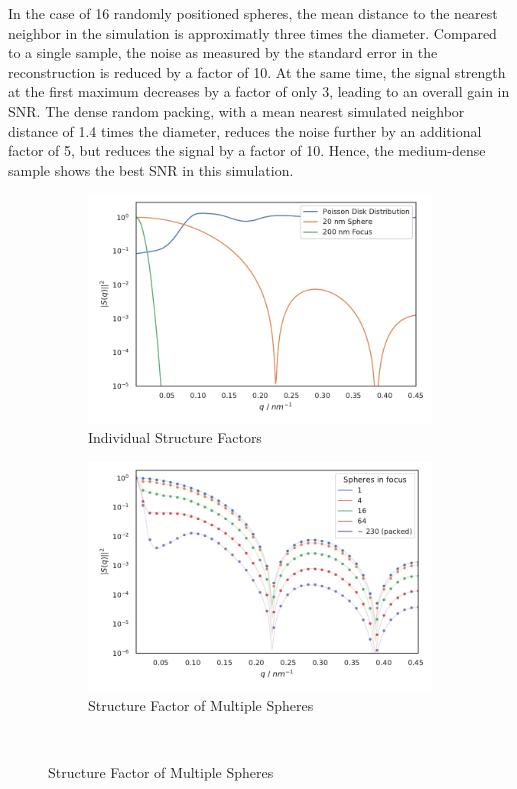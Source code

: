 In the case of 16 randomly positioned spheres, the mean distance to the nearest neighbor in the simulation is approximatly three times the diameter. Compared to a single sample, the noise as measured by the standard error in the reconstruction is reduced by a factor of 10. At the same time, the  signal strength at the first maximum decreases by a factor of only 3, leading to an overall gain in SNR.  The dense random packing, with a mean nearest simulated neighbor distance of 1.4 times the diameter, reduces the noise further by an additional factor of 5, but  reduces the signal by a factor of 10. Hence, the medium-dense sample shows the best SNR in this simulation.
 
\begin{figure}
	\centering
	\begin{subfigure}[b]{0.45\textwidth}
		\includegraphics[width=\linewidth]{images/multisphere1.pdf}
		\caption{Individual Structure Factors}
		\label{fig:multisphere1}
	\end{subfigure}
	\begin{subfigure}[b]{0.45\textwidth}
		\includegraphics[width=\linewidth]{images/multisphere3.pdf}
		\caption{Structure Factor of Multiple Spheres}
		\label{fig:multisphere3}
	\end{subfigure}\\


\end{figure}

